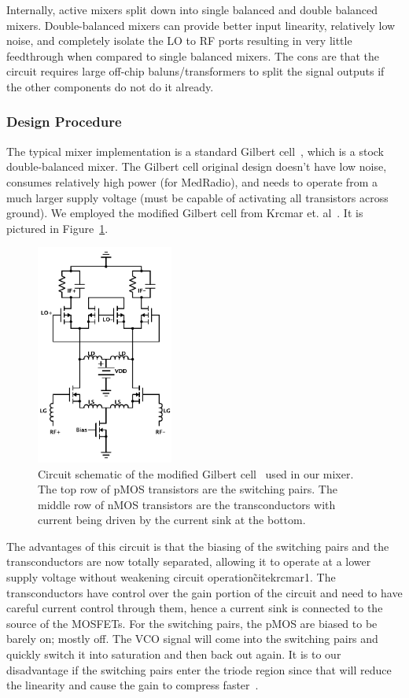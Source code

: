 Internally, active mixers split down into single balanced and double balanced mixers. Double-balanced mixers can provide better input linearity, relatively low noise, and completely isolate the LO to RF ports resulting in very little feedthrough when compared to single balanced mixers. The cons are that the circuit requires large off-chip baluns/transformers to split the signal outputs if the other components do not do it already. 

\subsubsection{Design Procedure}
The typical mixer implementation is a standard Gilbert cell~\cite{gilbert}, which is a stock double-balanced mixer. The Gilbert cell original design doesn't have low noise, consumes relatively high power (for MedRadio), and needs to operate from a much larger supply voltage (must be capable of activating all transistors across ground). We employed the modified Gilbert cell from Krcmar et. al~\cite{krcmar1}. It is pictured in Figure~\ref{fig:mixer}. 

\begin{figure}[h]
   \centering
    \includegraphics[width=0.40\textwidth]{figures/Mixer.pdf}
    \caption{
        Circuit schematic of the modified Gilbert cell~\cite{krcmar1} used in our mixer. The top row of pMOS transistors are the switching pairs. The middle row of nMOS transistors are the transconductors with current being driven by the current sink at the bottom.
    }
    \label{fig:mixer}
\end{figure}

The advantages of this circuit is that the biasing of the switching pairs and the transconductors are now totally separated, allowing it to operate at a lower supply voltage without weakening circuit operation\~cite{krcmar1}. The transconductors have control over the gain portion of the circuit and need to have careful current control through them, hence a current sink is connected to the source of the MOSFETs. For the switching pairs, the pMOS are biased to be barely on; mostly off.  The VCO signal will come into the switching pairs and quickly switch it into saturation and then back out again. It is to our disadvantage if the switching pairs enter the triode region since that will reduce the linearity and cause the gain to compress faster~\cite{Razavi}. 

